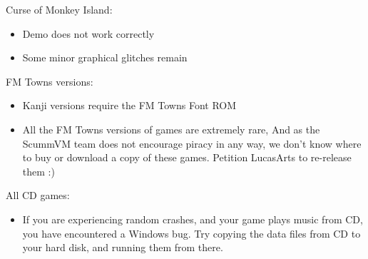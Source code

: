Curse of Monkey Island:
  \begin{itemize}
  \item Demo does not work correctly
  \item Some minor graphical glitches remain
  \end{itemize}
FM Towns versions:
  \begin{itemize}
  \item Kanji versions require the FM Towns Font ROM
  \item All the FM Towns versions of games are extremely rare,
                  And as the ScummVM team does not encourage piracy in any
                  way, we don't know where to buy or download a copy of these
                  games. Petition LucasArts to re-release them :)
  \end{itemize}
All CD games:
  \begin{itemize}
  \item If you are experiencing random crashes, and your game
                 plays music from CD, you have encountered a Windows bug.
                 Try copying the data files from CD to your hard disk, and
                 running them from there.
  \end{itemize}
